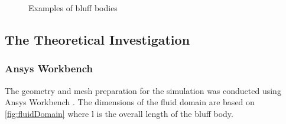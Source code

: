 \begin{figure}[H]
\begin{center}
	\end{center}
	\caption{Examples of bluff bodies}
	\label{fig:bluffBodies}
\end{figure}
\subsection{The Theoretical Investigation}
\subsubsection{Ansys Workbench}
\label{sec:ansysWorkbench}
The geometry and mesh preparation for the simulation was conducted using Ansys Workbench \parencite{noauthor_ansys_nodate}. The dimensions of the fluid domain are based on \ref{fig:fluidDomain} where l is the overall length of the bluff body.

\newlength\unitL
\setlength\unitL{0.2cm}


